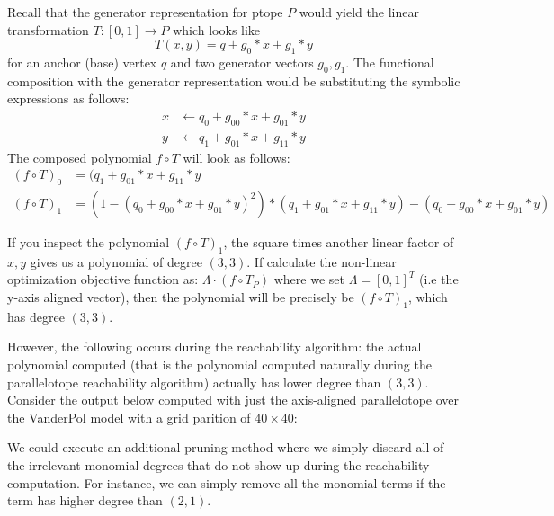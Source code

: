 Recall that the generator representation for ptope $P$ would yield the linear transformation $T:[0,1] \rightarrow P$ which looks like $$ T(x,y) = q + g_0*x + g_1*y$$ for an anchor (base) vertex $q$ and two generator vectors $g_0,g_1$.
%
The functional composition with the generator representation would be substituting the symbolic expressions as follows:
%
\begin{align} x & \leftarrow q_0 + g_{00}*x + g_{01}*y \\  y & \leftarrow q_1 + g_{01}*x + g_{11}*y\end{align}
%
The composed polynomial $f \circ T$ will look as follows:
%
\begin{align} (f \circ T)_0 & = (q_1 + g_{01}*x + g_{11}*y \\ (f \circ T)_1 & = (1 - (q_0 + g_{00}*x + g_{01}*y)^2) * (q_1 + g_{01}*x + g_{11}*y) - (q_0 + g_{00}*x + g_{01}*y) \end{align}

If you inspect the polynomial $(f \circ T)_1$, the square times another linear factor of $x,y$ gives us a polynomial of degree $(3,3)$. If calculate the non-linear optimization objective function as: $\Lambda \cdot (f \circ T_P)$ where we set $\Lambda = [0,1]^T$ (i.e the y-axis aligned vector), then the polynomial will be precisely be $(f \circ T)_1$, which has degree $(3,3)$.

However, the following occurs during the reachability algorithm: the actual polynomial computed (that is the polynomial computed naturally during the parallelotope reachability algorithm) actually has lower degree than $(3,3)$. Consider the output below computed with just the axis-aligned parallelotope over the VanderPol model with a grid parition of $40 \times 40$:

%

We could execute an additional pruning method where we simply discard all of the irrelevant monomial degrees that do not show up during the reachability computation. For instance, we can simply remove all the monomial terms if the term has higher degree than $(2,1)$.


